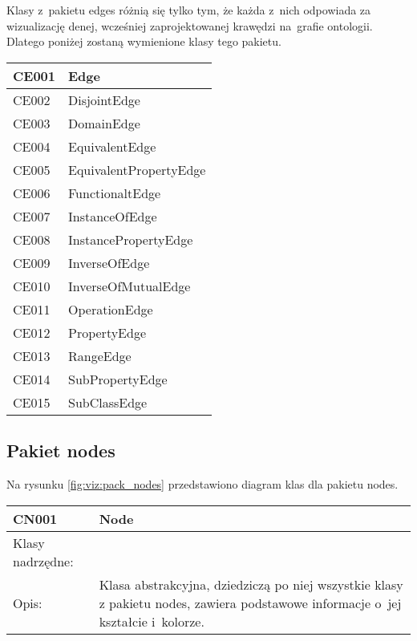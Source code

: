 Klasy z~pakietu edges różnią się tylko tym, że każda z~nich odpowiada za wizualizację denej, wcześniej zaprojektowanej krawędzi na~grafie ontologii.
Dlatego poniżej zostaną wymienione klasy tego pakietu.

\begin{longtable}{|m{4cm}|m{8cm}|} \hline
CE001  & Edge  \\ \hline
CE002  & DisjointEdge \\ \hline
CE003  & DomainEdge \\ \hline
CE004  & EquivalentEdge \\ \hline
CE005  & EquivalentPropertyEdge \\ \hline
CE006  & FunctionaltEdge \\ \hline
CE007  & InstanceOfEdge \\ \hline
CE008  & InstancePropertyEdge \\ \hline 
CE009  & InverseOfEdge \\ \hline
CE010  & InverseOfMutualEdge \\ \hline 
CE011  & OperationEdge \\ \hline 
CE012  & PropertyEdge \\ \hline
CE013  & RangeEdge \\ \hline
CE014  & SubPropertyEdge \\ \hline
CE015  & SubClassEdge \\ \hline


\end{longtable}

 

\subsection*{Pakiet nodes}

Na rysunku  \figurename \space \ref{fig:viz:pack_nodes}  przedstawiono diagram klas dla pakietu nodes.


\begin{longtable}{|m{3.5cm}|m{8.5cm}|} \hline

CN001 & Node \\ \hline
Klasy nadrzędne: &     \\ \hline
Opis: & Klasa abstrakcyjna, dziedziczą po niej wszystkie klasy z pakietu nodes,  zawiera podstawowe informacje o~jej kształcie i~kolorze. 
\\ \hline


\end{longtable}


